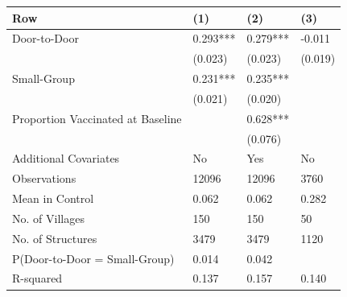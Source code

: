 
\begin{tabular}{llll}
\toprule
Row & (1) & (2) & (3)\\
\midrule
Door-to-Door & 0.293*** & 0.279*** & -0.011\\
 & (0.023) & (0.023) & (0.019)\\
Small-Group & 0.231*** & 0.235*** & \\
 & (0.021) & (0.020) & \\
Proportion Vaccinated at Baseline &  & 0.628*** & \\
\addlinespace
 &  & (0.076) & \\
Additional Covariates & No & Yes & No\\
Observations & 12096 & 12096 & 3760\\
Mean in Control & 0.062 & 0.062 & 0.282\\
No. of Villages & 150 & 150 & 50\\
\addlinespace
No. of Structures & 3479 & 3479 & 1120\\
P(Door-to-Door = Small-Group) & 0.014 & 0.042 & \\
R-squared & 0.137 & 0.157 & 0.140\\
\bottomrule
\end{tabular}
